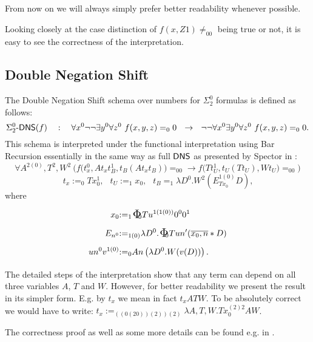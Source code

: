 %
\begin{rmk}From now on we will always simply prefer better readability
 whenever possible.\end{rmk}
Looking closely at the case distinction of $f(x,Z1)\neq_00$ being true or not, 
it is easy to see the correctness of the interpretation.
%
%
\subsection{Double Negation Shift} \label{ss:DNS}
The Double Negation Shift
schema over numbers for $\Sigma^0_2$ formulas is defined as follows:
\[
\defkeyn{\text{$\Sigma^0_2\usftext{-}\DNS(f)$}}\quad:\quad
 \forall x^0\neg\neg\exists y^0\forall z^0\ f(x,y,z)=_00\ \ \rightarrow\ \ 
     \neg\neg\forall x^0\exists y^0\forall z^0\ f(x,y,z)=_00  
\text{.}\]
This schema is interpreted under the functional interpretation using Bar Recursion essentially in the same way as full $\textsf{\upshape DNS}$ as presented by Spector in \cite{Spector62}:
\[ \forall A^{2(0)},T^2,W^2\ \Big(  f\big( t_x^0, At_xt_B^1, t_B(At_xt_B)\big)=_00  
     \rightarrow f\big(Tt_U^1,t_U(Tt_U),Wt_U\big)=_00\Big)  
\]
\[  t_x:=_0 Tx_0^1\text{,}\ \ \ \ 
      t_U:=_1 x_0\text{,}\ \ \ \  
      t_B=_1 \lambda D^0.W^2(E^{1(0)}_{Tx_0}D)
  \text{,}\]
where
\begin{align*}
     x_0 &{:=_1}  \bPhi_0Tu^{1(1(0))}0^00^1 \\
     E_{n^0} &{:=_{1(0)}} \lambda D^0.\bPhi_0Tun'(\overline{x_0,n}*D) \\
     un^0v^{1(0)} &{:=_0} An\left(\lambda D^0.W(v(D))\right) \text{.}
\end{align*}
\begin{rmk}The detailed steps of the interpretation show
 that any term can depend on all three variables $A$, $T$ and $W$. 
However, for better readability we present the result in its simpler form. E.g.
by $t_x$ we mean in fact $t_xATW$. To be absolutely correct
we would have to write: $t_x:=_{((0(20))(2))(2)} \lambda A,T,W. Tx_0^{(2)2}AW$.\end{rmk}
The correctness proof as well as some more details can be 
found e.g. in \cite{Kohlenbach08}.
%
%
%
%
%
